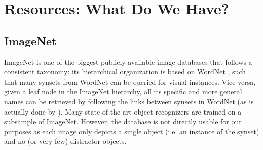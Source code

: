 \documentclass[runningheads]{llncs}
\newcommand{\cs}[1]{\textcolor{PineGreen}{\emph{//cs: #1//}}}
\newcommand{\refexp}[1]{\textsl{#1}}
\begin{document}
%
%


\section{Resources: What Do We Have?}
\label{sec:resources}

\subsection{ImageNet}

ImageNet \cite{imagenet_cvpr09} is one of the biggest publicly available image databases that follows a consistent taxonomy: its hierarchical organization is based on WordNet \cite{fellbaum1998wordnet}, such that many synsets from WordNet can be queried for visual instances.
Vice versa, given a leaf node in the ImageNet hierarchy, all its specific and more general names can be retrieved by following the links between synsets in WordNet (as is actually done by \cite{Ordonez:2016}).
Many state-of-the-art object recognizers are trained on a subsample of ImageNet.
However, the database is not directly usable for our purposes as each image only depicts a single object (i.e. an instance of the synset) and no (or very few) distractor objects. 
\end{document}
